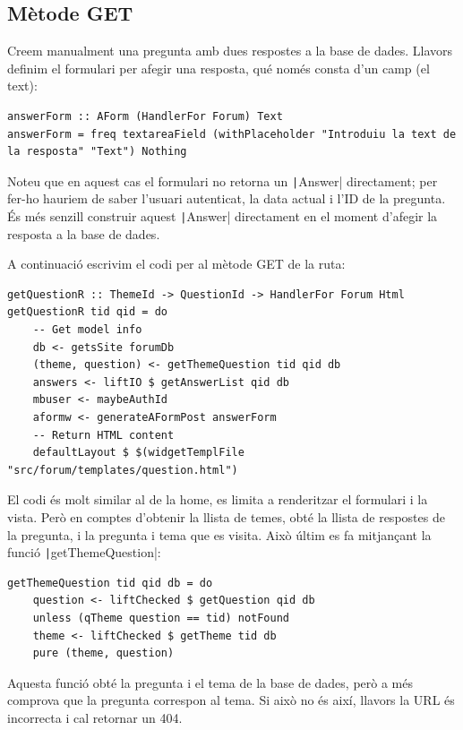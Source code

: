 \documentclass[catalan, a4paper]{scrartcl}
\begin{document}
\subsection*{Mètode \textsf{GET}}

Creem manualment
una pregunta amb dues respostes a la base de dades. Llavors definim el formulari
per afegir una resposta, qué només consta d'un camp (el text):

\begin{verbatim}
answerForm :: AForm (HandlerFor Forum) Text
answerForm = freq textareaField (withPlaceholder "Introduiu la text de la resposta" "Text") Nothing
\end{verbatim}

Noteu que en aquest cas el formulari no retorna un \texttt|Answer|
directament; per fer-ho hauriem de saber l'usuari autenticat, la data actual i
l'ID de la pregunta. És més senzill construir aquest \texttt|Answer|
directament en el moment d'afegir la resposta a la base de dades.

A continuació escrivim el codi per al mètode \textsf{GET} de la ruta:

\begin{verbatim}
getQuestionR :: ThemeId -> QuestionId -> HandlerFor Forum Html
getQuestionR tid qid = do
    -- Get model info
    db <- getsSite forumDb
    (theme, question) <- getThemeQuestion tid qid db
    answers <- liftIO $ getAnswerList qid db
    mbuser <- maybeAuthId
    aformw <- generateAFormPost answerForm
    -- Return HTML content
    defaultLayout $ $(widgetTemplFile "src/forum/templates/question.html")
\end{verbatim}

El codi és molt similar al de la home, es limita a renderitzar el formulari i la vista.
Però en comptes d'obtenir la llista de temes,
obté la llista de respostes de la pregunta, i la pregunta i tema que es visita. Això
últim es fa mitjançant la funció \texttt|getThemeQuestion|:

\begin{verbatim}
getThemeQuestion tid qid db = do
    question <- liftChecked $ getQuestion qid db
    unless (qTheme question == tid) notFound
    theme <- liftChecked $ getTheme tid db
    pure (theme, question)
\end{verbatim}

Aquesta funció obté la pregunta i el tema de la base de dades, però a més comprova
que la pregunta correspon al tema. Si això no és així, llavors la URL és incorrecta
i cal retornar un 404.
\end{document}
